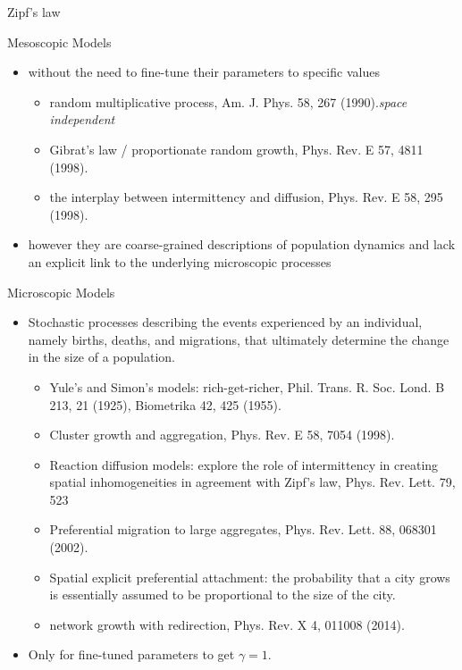\documentclass{beamer}
\begin{document}
\begin{frame}{Zipf's law}
\begin{frame}{Mesoscopic Models}
\begin{itemize}
  \item without the need to fine-tune their parameters to specific values
  \begin{itemize}
    \item random multiplicative process, Am. J. Phys. 58, 267 (1990).\emph{space independent}
    \item Gibrat's law / proportionate random growth, Phys. Rev. E 57, 4811 (1998).
    \item the interplay between intermittency and diffusion, Phys. Rev. E 58, 295 (1998).
  \end{itemize}
  \item however they are coarse-grained descriptions of population dynamics and lack an explicit link to the underlying microscopic processes
\end{itemize}
\end{frame}

\begin{frame}{Microscopic Models}
  \begin{itemize}
    \item Stochastic processes describing the events experienced by an individual, namely births, deaths, and migrations, that ultimately determine the change in the size of a population.
    \begin{itemize}
      \item Yule's and Simon's models: rich-get-richer, Phil. Trans. R. Soc. Lond. B 213, 21 (1925), Biometrika 42, 425 (1955).
      \item Cluster growth and aggregation, Phys. Rev. E 58, 7054 (1998).
      \item Reaction diffusion models: explore the role of intermittency in creating spatial inhomogeneities in agreement with Zipf’s law, Phys. Rev. Lett. 79, 523
      \item Preferential migration to large aggregates, Phys. Rev. Lett. 88, 068301 (2002).
      \item Spatial explicit preferential attachment: the probability that a city grows is essentially assumed to be proportional to the size of the city.
      \item network growth with redirection, Phys. Rev. X 4, 011008 (2014).
    \end{itemize}
    \item Only for fine-tuned parameters to get $\gamma=1$.
  \end{itemize}
\end{frame}


\end{frame}
\end{document}
